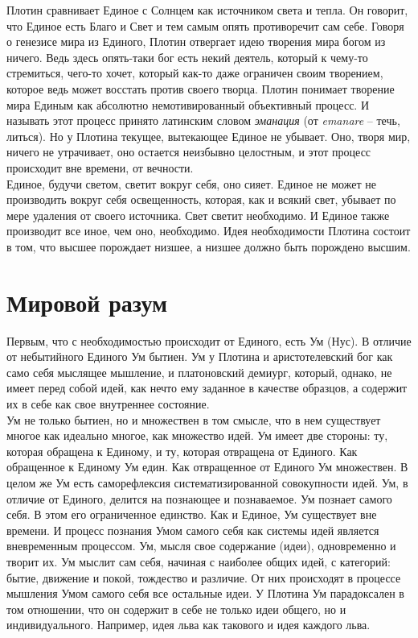 \documentclass[a4paper,12pt]{article}
\begin{document}
Плотин сравнивает Единое с Солнцем как источником света и тепла. Он говорит, что Единое есть Благо и Свет и тем самым опять противоречит сам себе.
Говоря о генезисе мира из Единого, Плотин отвергает идею творения мира богом из ничего. Ведь здесь опять-таки бог есть некий деятель, который к чему-то стремиться, чего-то хочет, который как-то даже ограничен своим творением, которое ведь может восстать против своего творца. Плотин понимает творение мира Единым как абсолютно немотивированный объективный процесс. И называть этот процесс принято латинским словом \textit{эманация} (от \textit{emanare} – течь, литься). Но у Плотина текущее, вытекающее Единое не убывает. Оно, творя мир, ничего не утрачивает, оно остается неизбывно целостным, и этот процесс происходит вне времени, от вечности. \\

Единое, будучи светом, светит вокруг себя, оно сияет. Единое не может не производить вокруг себя освещенность, которая, как и всякий свет, убывает по мере удаления от своего источника. Свет светит необходимо. И Единое также производит все иное, чем оно, необходимо. Идея необходимости Плотина состоит в том, что высшее порождает низшее, а низшее должно быть порождено высшим.

\part{Мировой разум}

Первым, что с необходимостью происходит от Единого, есть Ум (Нус). В отличие от небытийного Единого Ум бытиен. Ум у Плотина и аристотелевский бог как само себя мыслящее мышление, и платоновский демиург, который, однако, не имеет перед собой идей, как нечто ему заданное в качестве образцов, а содержит их в себе как свое внутреннее состояние. \\
Ум не только бытиен, но и множествен в том смысле, что в нем существует многое как идеально многое, как множество идей. Ум имеет две стороны: ту, которая обращена к Единому, и ту, которая отвращена от Единого. Как обращенное к Единому Ум един. Как отвращенное от Единого Ум множествен. В целом же Ум есть саморефлексия систематизированной совокупности идей. Ум, в отличие от Единого, делится на познающее и познаваемое. Ум познает самого себя. В этом его ограниченное единство. Как и Единое, Ум существует вне времени. И процесс познания Умом самого себя как системы идей является вневременным процессом. Ум, мысля свое содержание (идеи), одновременно и творит их. Ум мыслит сам себя, начиная с наиболее общих идей, с категорий: бытие, движение и покой, тождество и различие. От них происходят в процессе мышления Умом самого себя все остальные идеи.
У Плотина Ум парадоксален в том отношении, что он содержит в себе не только идеи общего, но и индивидуального. Например, идея льва как такового и идея каждого льва.
\newpage
\end{document}
